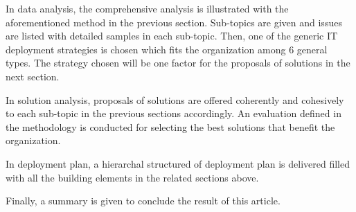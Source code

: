 In data analysis, the comprehensive analysis is illustrated with the aforementioned method in the previous section. Sub-topics are given and issues are listed with detailed samples in each sub-topic. Then, one of the generic IT deployment strategies is chosen which fits the organization among 6 general types. The strategy chosen will be one factor for the proposals of solutions in the next section.

In solution analysis, proposals of solutions are offered coherently and cohesively to each sub-topic in the previous sections accordingly. An evaluation defined in the methodology is conducted for selecting the best solutions that benefit the organization.

In deployment plan, a hierarchal structured of deployment plan is delivered filled with all the building elements in the related sections above.

Finally, a summary is given to conclude the result of this article.



